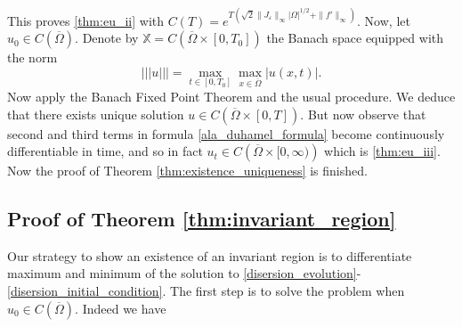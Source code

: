 \documentclass[12pt, a4paper]{article}
\theoremstyle{break}
\theoremstyle{break}
\theoremstyle{break}
\theoremstyle{break}
\theoremstyle{break}
\begin{document}
This proves \ref{thm:eu_ii} with $C(T) = e^{T \left( \sqrt{2}\|J_\varepsilon\|_\infty |\Omega|^{1/2} + \|f'\|_\infty \right)}$. Now, let $u_0 \in C(\overline{\Omega})$. Denote by $\mathbb{X} = C\left(\overline{\Omega} \times [0, T_0]\right)$ the Banach space equipped with the norm
\begin{equation*}
    ||| u ||| = \max_{t \in [0, T_0]} \max_{x \in \overline{\Omega}} |u(x,t)|.
\end{equation*}
Now apply the Banach Fixed Point Theorem and the usual procedure. We deduce that there exists unique solution $u \in C\left( \overline{\Omega} \times [0, T] \right)$. But now observe that second and third terms in formula \eqref{ala_duhamel_formula} become continuously differentiable in time, and so in fact $u_t \in C\left( \overline{\Omega} \times [0, \infty) \right)$ which is \ref{thm:eu_iii}. Now the proof of Theorem \ref{thm:existence_uniqueness} is finished.

\subsection{Proof of Theorem \ref{thm:invariant_region}}

Our strategy to show an existence of an invariant region is to differentiate maximum and minimum of the solution to \eqref{disersion_evolution}-\eqref{disersion_initial_condition}. The first step is to solve the problem when $u_0 \in C(\overline{\Omega})$. Indeed we have
\end{document}

